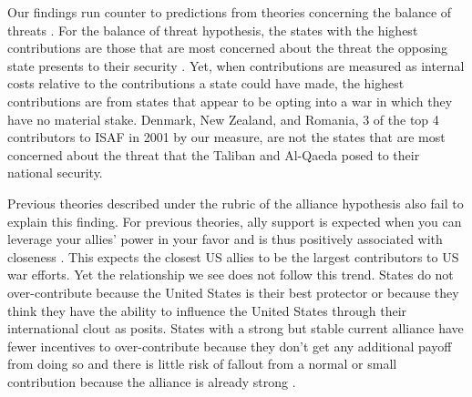 \documentclass[12pt,letterpaper]{article}
\begin{document}
	Our findings run counter to predictions from theories concerning the balance of threats \citep{walt_originsalliance_1987}. For the balance of threat hypothesis, the states with the highest contributions are those that are most concerned about the threat the opposing state presents to their security \citep{haesebrouck_democraticparticipationair_2016}. Yet, when contributions are measured as internal costs relative to the contributions a state could have made, the highest contributions are from states that appear to be opting into a war in which they have no material stake. Denmark, New Zealand, and Romania, 3 of the top 4 contributors to ISAF in 2001 by our measure, are not the states that are most concerned about the threat that the Taliban and Al-Qaeda posed to their national security.

	Previous theories described under the rubric of the alliance hypothesis also fail to explain this finding. For previous theories, ally support is expected when you can leverage your allies' power in your favor and is thus positively associated with closeness \citep{davidson_neoclassicalrealistexplanation_2011, massie_democraticalliesfollowership_2016}. This expects the closest US allies to be the largest contributors to US war efforts. Yet the relationship we see does not follow this trend. States do not over-contribute because the United States is their best protector or because they think they have the ability to influence the United States through their international clout as \citet{ringsmose_natoburdensharingredux_2010} posits. States with a strong but stable current alliance have fewer incentives to over-contribute because they don't get any additional payoff from doing so and there is little risk of fallout from a normal or small contribution because the alliance is already strong \citep{davidson_headingexitsdemocratic_2014}.
	
\end{document}
